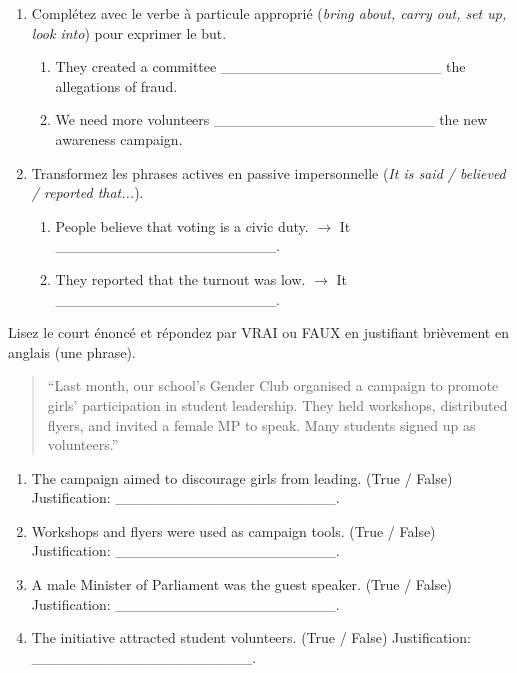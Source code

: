 \documentclass[11pt]{article}
\begin{document}
\begin{exercice}
\begin{enumerate}
    \item Complétez avec le verbe à particule approprié (\textit{bring about, carry out, set up, look into}) pour exprimer le but.
        \begin{enumerate}
            \item They created a committee \_\_\_\_\_\_\_\_\_\_\_\_\_\_\_\_\_\_\_\_\_ the allegations of fraud.
            \item We need more volunteers \_\_\_\_\_\_\_\_\_\_\_\_\_\_\_\_\_\_\_\_\_ the new awareness campaign.
        \end{enumerate}
    \item Transformez les phrases actives en passive impersonnelle (\textit{It is said / believed / reported that...}).
        \begin{enumerate}
            \item People believe that voting is a civic duty. $\rightarrow$ It \_\_\_\_\_\_\_\_\_\_\_\_\_\_\_\_\_\_\_\_\_.
            \item They reported that the turnout was low. $\rightarrow$ It \_\_\_\_\_\_\_\_\_\_\_\_\_\_\_\_\_\_\_\_\_.
        \end{enumerate}
\end{enumerate}
\end{exercice}

\begin{exercice}
Lisez le court énoncé et répondez par VRAI ou FAUX en justifiant brièvement en anglais (une phrase).
\begin{quote}
``Last month, our school's Gender Club organised a campaign to promote girls' participation in student leadership. They held workshops, distributed flyers, and invited a female MP to speak. Many students signed up as volunteers.''
\end{quote}
\begin{enumerate}
    \item The campaign aimed to discourage girls from leading. (True / False) Justification: \_\_\_\_\_\_\_\_\_\_\_\_\_\_\_\_\_\_\_\_\_.
    \item Workshops and flyers were used as campaign tools. (True / False) Justification: \_\_\_\_\_\_\_\_\_\_\_\_\_\_\_\_\_\_\_\_\_.
    \item A male Minister of Parliament was the guest speaker. (True / False) Justification: \_\_\_\_\_\_\_\_\_\_\_\_\_\_\_\_\_\_\_\_\_.
    \item The initiative attracted student volunteers. (True / False) Justification: \_\_\_\_\_\_\_\_\_\_\_\_\_\_\_\_\_\_\_\_\_.
\end{enumerate}
\end{exercice}
\end{document}
